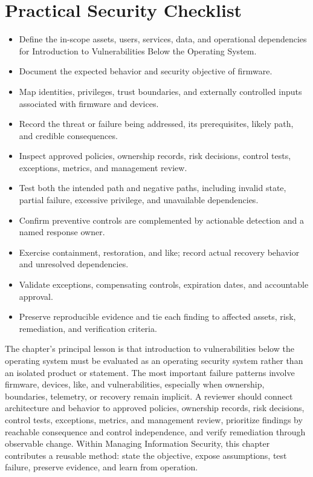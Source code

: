 \documentclass[11pt]{article}
\begin{document}
\section*{Practical Security Checklist}
\begin{itemize}[label=$\square$]
\item Define the in-scope assets, users, services, data, and operational dependencies for Introduction to Vulnerabilities Below the Operating System.
\item Document the expected behavior and security objective of firmware.
\item Map identities, privileges, trust boundaries, and externally controlled inputs associated with firmware and devices.
\item Record the threat or failure being addressed, its prerequisites, likely path, and credible consequences.
\item Inspect approved policies, ownership records, risk decisions, control tests, exceptions, metrics, and management review.
\item Test both the intended path and negative paths, including invalid state, partial failure, excessive privilege, and unavailable dependencies.
\item Confirm preventive controls are complemented by actionable detection and a named response owner.
\item Exercise containment, restoration, and like; record actual recovery behavior and unresolved dependencies.
\item Validate exceptions, compensating controls, expiration dates, and accountable approval.
\item Preserve reproducible evidence and tie each finding to affected assets, risk, remediation, and verification criteria.
\end{itemize}
\begin{synthesisbox}
The chapter's principal lesson is that introduction to vulnerabilities below the operating system must be evaluated as an operating security system rather than an isolated product or statement. The most important failure patterns involve firmware, devices, like, and vulnerabilities, especially when ownership, boundaries, telemetry, or recovery remain implicit. A reviewer should connect architecture and behavior to approved policies, ownership records, risk decisions, control tests, exceptions, metrics, and management review, prioritize findings by reachable consequence and control independence, and verify remediation through observable change. Within Managing Information Security, this chapter contributes a reusable method: state the objective, expose assumptions, test failure, preserve evidence, and learn from operation.
\end{synthesisbox}
\end{document}

